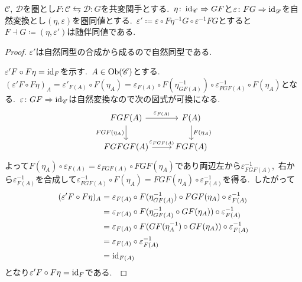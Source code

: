 \begin{proposition}
$\mathscr{C},\ \mathscr{D}$を圏とし$F \colon \mathscr{C} \leftrightarrows \mathscr{D} \colon G$を共変関手とする.\
$\eta \colon \operatorname{id}_{\mathscr{C}} \Rightarrow GF$と$\varepsilon \colon FG \Rightarrow \operatorname{id}_{\mathscr{D}}$を自然変換とし$(\eta,\varepsilon)$を圏同値とする.\
$\varepsilon' \coloneq \varepsilon \circ F \eta^{-1} G \circ \varepsilon^{-1} FG$とすると$F \dashv G \coloneq (\eta, \varepsilon')$は随伴同値である.
\end{proposition}

\begin{proof}
$\varepsilon'$は自然同型の合成から成るので自然同型である.\

$\varepsilon' F \circ F \eta = \operatorname{id}_F$を示す.\
$A \in \operatorname{Ob}(\mathscr{C})$とする.\ $(\varepsilon' F \circ F \eta)_A = \varepsilon'_{F(A)} \circ F(\eta_A) = \varepsilon_{F(A)} \circ F(\eta_{GF(A)}^{-1}) \circ \varepsilon_{FGF(A)}^{-1} \circ F(\eta_A)$となる.\ $\varepsilon \colon GF \Rightarrow \operatorname{id}_{\mathscr{C}}$は自然変換なので次の図式が可換になる.\
\[\begin{tikzcd}
	{FGF(A)} & {F(A)} \\
	{FGFGF(A)} & {FGF(A)}
	\arrow["{\varepsilon_{F(A)}}", from=1-1, to=1-2]
	\arrow["{FGF(\eta_A)}"', from=1-1, to=2-1]
	\arrow["{F(\eta_A)}", from=1-2, to=2-2]
	\arrow["{\varepsilon_{FGF(A)}}", from=2-1, to=2-2]
\end{tikzcd}\]
よって$F(\eta_A) \circ \varepsilon_{F(A)} = \varepsilon_{FGF(A)} \circ FGF(\eta_A)$であり両辺左から$\varepsilon_{FGF(A)}^{-1}$,\ 右から$\varepsilon_{F(A)}^{-1}$を合成して$\varepsilon_{FGF(A)}^{-1} \circ F(\eta_A) = FGF(\eta_A) \circ  \varepsilon_{F(A)}^{-1}$を得る.\
したがって
\begin{align*}
	(\varepsilon'F \circ  F \eta)_A &= \varepsilon_{F(A)} \circ F(\eta_{GF(A)}^{-1}) \circ FGF(\eta_A) \circ \varepsilon_{F(A)}^{-1} \\
					&= \varepsilon_{F(A)} \circ F(\eta_{GF(A)}^{-1} \circ  GF(\eta_A)) \circ \varepsilon_{F(A)}^{-1} \\
					&= \varepsilon_{F(A)} \circ F(GF(\eta_A^{-1}) \circ GF(\eta_A)) \circ \varepsilon_{F(A)}^{-1} \\
					&= \varepsilon_{F(A)} \circ \varepsilon_{F(A)}^{-1} \\
					&= \operatorname{id}_{F(A)}
\end{align*}
となり$\varepsilon'F \circ  F \eta = \operatorname{id}_F$である.\


\end{proof}
